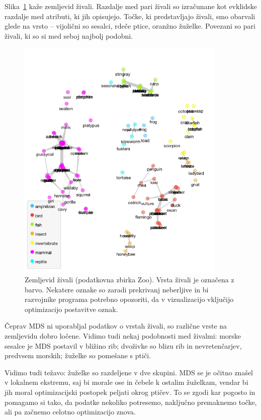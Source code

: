 Slika~\ref{f-zoo-mds} kaže zemljevid živali. Razdalje med pari živali so izračunane kot evklidske razdalje med atributi, ki jih opisujejo. Točke, ki predstavljajo živali, smo obarvali glede na vrsto -- vijolični so sesalci, rdeče ptice, oranžno žuželke. Povezani so pari živali, ki so si med seboj najbolj podobni.

\begin{figure}[tbp]
\begin{center}
\includegraphics[width=10cm]{slike/zoo-mds.png}
\caption{Zemljevid živali (podatkovna zbirka Zoo). Vrsta živali je označena z barvo. Nekatere oznake so zaradi prekrivanj neberljive in bi razvojnike programa potrebno opozoriti, da v vizualizacijo vključijo optimizacijo postavitve oznak.}
\label{f-zoo-mds}
\end{center}
\end{figure}

Čeprav MDS ni uporabljal podatkov o vrstah živali, so različne vrste na zemljevidu dobro ločene. Vidimo tudi nekaj podobnosti med živalmi: morske sesalce je MDS postavil v bližino rib; dvoživke so blizu rib in nevretenčarjev, predvsem morskih; žuželke so pomešane s ptiči.

Vidimo tudi težavo: žuželke so razdeljene v dve skupini. MDS se je očitno znašel v lokalnem ekstremu, saj bi morale ose in čebele k ostalim žuželkam, vendar bi jih moral optimizacijski postopek peljati okrog ptičev. To se zgodi kar pogosto in pomagamo si tako, da podatke nekoliko potresemo, naključno premaknemo točke, ali pa začnemo celotno optimizacijo znova.

